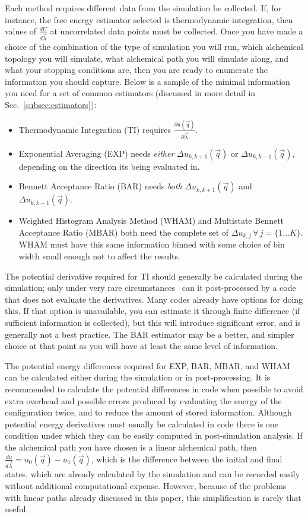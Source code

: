 \documentclass[9pt,bestpractices,pubversion]{livecoms}
\begin{document}
Each method requires different data from the simulation be collected. If, for instance, the free energy estimator selected is thermodynamic integration, then values of $\frac{dU}{d\vec{\lambda}}$ at uncorrelated data points must be collected. Once you have made a choice of the combination of the type of simulation you will run, which alchemical topology you will simulate, what alchemical path you will simulate along, and what your stopping conditions are, then you are ready to enumerate the information you should capture. Below is a sample of the minimal information you need for a set of common estimators (discussed in more detail in Sec.~\ref{subsec:estimators}):

\begin{itemize}
    \item Thermodynamic Integration (TI) requires $\frac{\partial u(\vec{q})}{\partial\vec{\lambda}}$.
    \item Exponential Averaging (EXP) needs \textit{either} $\Delta u_{k,k+1}(\vec{q})$ or $\Delta u_{k,k-1}(\vec{q})$, depending on the direction its being evaluated in.
    \item Bennett Acceptance Ratio (BAR) needs \textit{both} $\Delta u_{k,k+1}(\vec{q})$ and $\Delta u_{k,k-1}(\vec{q})$.
    \item Weighted Histogram Analysis Method (WHAM) and Multistate Bennett Acceptance Ratio (MBAR) both need the complete set of $\Delta u_{k,j} \, \forall \, j=\{1...K\}$. WHAM must have this same information binned with some choice of bin width small enough not to affect the results.
\end{itemize}

The potential derivative required for TI should generally be calculated during the simulation; only under very rare circumstances~\cite{naden2015linear} can it post-processed by a code that does not evaluate the derivatives. Many codes already have options for doing this.
If that option is unavailable, you can estimate it through finite difference (if sufficient information is collected), but this will introduce significant error, and is generally not a best practice. The BAR estimator may be a better, and simpler choice at that point as you will have at least the same level of information. 

The potential energy differences required for EXP, BAR, MBAR, and WHAM can be calculated either during the simulation or in post-processing. It is recommended to calculate the potential differences in code when possible to avoid extra overhead and possible errors produced by evaluating the energy of the configuration twice, and to reduce the amount of stored information. 
Although potential energy derivatives must usually be calculated in code there is one condition under which they can be easily computed in post-simulation analysis. 
If the alchemical path you have chosen is a linear alchemical path, then $\frac{du}{d\vec{\lambda}} = u_0(\vec{q}) - u_1(\vec{q})$, which is the difference between the initial and final states, which are already calculated by the simulation and can be recorded easily without additional computational expense. 
However, because of the problems with linear paths already discussed in this paper, this simplification is rarely that useful.
\end{document}
